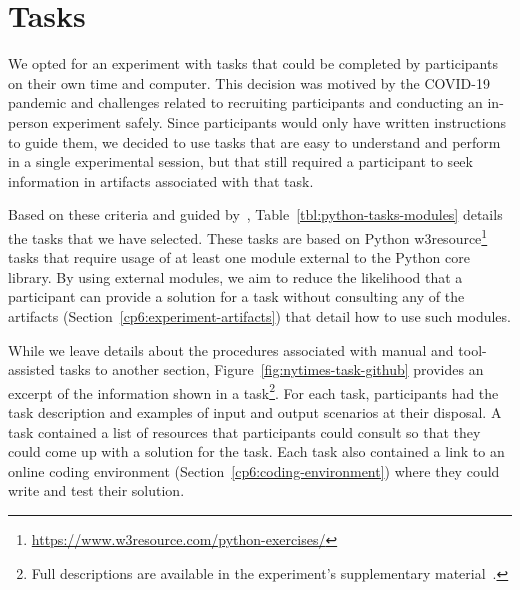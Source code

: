 
\section{Tasks}
\label{cp6:tasks}



We opted for an experiment with tasks that could be completed by participants on their own time and computer.
This decision was motived by the COVID-19 pandemic and challenges related to recruiting participants and conducting an in-person experiment safely\red{~\cite{}}. 
Since participants would only have written instructions to guide them, we decided to use tasks that are easy to understand and perform in a single experimental session, but that still required a participant  
to seek information in artifacts associated with that task.

% 


Based on these criteria and guided by~\cite{thiselton2019},
Table~\ref{tbl:python-tasks-modules} details the tasks that we have selected. 
These tasks are based on 
Python w3resource\footnote{\url{https://www.w3resource.com/python-exercises/}} tasks
that require usage of at least one module external to the Python core library.
By using external modules, we aim to reduce the likelihood that a participant 
can provide a solution for a task without consulting any of the artifacts (Section~\ref{cp6:experiment-artifacts})
that detail how to use such modules. 











While we leave details about the procedures associated with manual and tool-assisted tasks to another section, Figure~\ref{fig:nytimes-task-github} provides an excerpt of the information shown in a task\footnote{Full descriptions are available in the experiment's supplementary material~\red{\cite{}}.}.
For each task, participants had the task description and examples of input and output scenarios at their disposal. A task contained a list of resources that participants could consult 
so that they could come up with a solution for the task.
Each task also contained a link to an online coding environment (Section~\ref{cp6:coding-environment})
where they could write and test their solution. 




